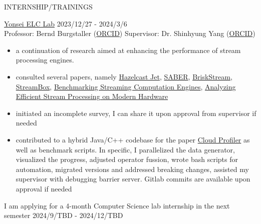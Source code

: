 \documentclass{resume} %
\begin{document}
\begin{rSection}{INTERNSHIP/TRAININGS} 

\href{https://elc.yonsei.ac.kr/}{Yonsei ELC Lab} \hfill 2023/12/27 - 2024/3/6 \\ 
Professor: Bernd Burgstaller (\href{https://orcid.org/0000-0002-0374-8853}{ORCID}) 
\qquad Supervisor: Dr. Shinhyung Yang (\href{https://orcid.org/0000-0002-8997-9942}{ORCID})
\begin{itemize}
\item a continuation of research aimed at enhancing the performance of stream processing engines.
\item consulted several papers, namely 
\href{https://arxiv.org/abs/2103.10169}{Hazelcast Jet},
\href{https://raulcastrofernandez.com/papers/sigmod16-saber.pdf}{SABER},
\href{https://arxiv.org/abs/1904.03604}{BriskStream},
\href{https://www.usenix.org/system/files/conference/atc17/atc17-miao.pdf}{StreamBox},
\href{https://ieeexplore.ieee.org/document/7530084}{Benchmarking Streaming Computation Engines},
\href{https://dl.acm.org/doi/10.14778/3303753.3303758}{Analyzing Efficient Stream Processing on Modern Hardware}
\item initiated an incomplete survey, I can share it upon approval from supervisor if needed
\item contributed to a hybrid Java/C++ codebase for the paper
\href{https://arxiv.org/abs/2205.09325}{Cloud Profiler} as well as benchmark
scripts. In specific, I parallelized the data generator, visualized the
progress, adjusted operator fussion, wrote bash scripts for automation,
migrated versions and addressed breaking changes, assisted my supervisor with
debugging barrier server. Gitlab commits are available upon approval if needed
\end{itemize}
{I am applying for a 4-month Computer Science lab internship in the next semester}       
\hfill 2024/9/TBD - 2024/12/TBD

\end{rSection} 

\end{document}
